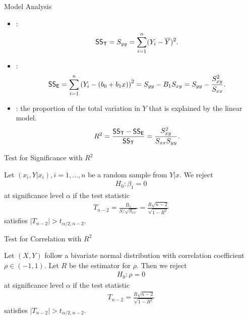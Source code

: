 \begin{frame}{Model Analysis}

\begin{itemize}
	\justifying
	\item {}:
	\begin{align*}
	\mathsf{SS_T} = S_{yy} = \sum_{i=1}^n (Y_i-\overline{Y})^2.
	\end{align*}
	\item {}:
	\begin{align*}
	\mathsf{SS_E} = \sum_{i=1}^n \left(Y_i-(b_0+b_1x)\right)^2 = S_{yy} - B_1 S_{xy} = S_{yy} - \frac{S_{xy}^2}{S_{xx}}.
	\end{align*}
	\item {}: the proportion of the total variation in $Y$ that is explained by the linear model.
	\begin{align*}
	R^2 = \frac{\mathsf{SS_T} - \mathsf{SS_E}}{\mathsf{SS_T}} = \frac{S_{xy}^2}{S_{xx}S_{yy}}.
	\end{align*}
\end{itemize}

\end{frame}


\begin{frame}{Test for Significance with $R^2$}

\justifying
{} Let $(x_i, Y|x_i), i = 1, \ldots, n$ be a random sample from $Y|x$. We reject
\begin{align*}
H_0: \beta_1 = 0
\end{align*}
at significance level $\alpha$ if the test statistic
\begin{align*}
T_{n-2} = \frac{B_1}{S/\sqrt{S_{xx}}} = \frac{R\sqrt{n-2}}{\sqrt{1-R^2}}
\end{align*}
satisfies $|T_{n-2}| > t_{\alpha/2,n-2}$.

\end{frame}


\begin{frame}{Test for Correlation with $R^2$}

\justifying
{} Let $(X, Y)$ follow a bivariate normal distribution with correlation coefficient $\rho\in (-1, 1)$. Let $R$ be the estimator for $\rho$. Then we reject
\begin{align*}
H_0: \rho = 0
\end{align*}
at significance level $\alpha$ if the test statistic
\begin{align*}
T_{n-2} = \frac{R\sqrt{n-2}}{\sqrt{1-R^2}}
\end{align*}
satisfies $|T_{n-2}| > t_{\alpha/2,n-2}$.

\end{frame}


